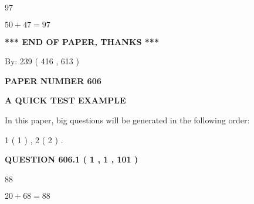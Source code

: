 \documentclass[12pt]{article}
\begin{document}
97
 
 
 
 
\noindent{}

$ %
50 +  %
47=   %
97$
 
 
   
   
 \vspace{0.2in}
 
   
   
   
   
\vspace{1.0in} 
{\textbf{\large{ *** END OF PAPER, THANKS *** }}} 
   
   
\hspace{1.0in} By: 
 239 ( 416 ,  613 )
   
   
   
   
\newpage 
\setcounter{page}{ 
   606001 } 
   
   
   
   
 {\textbf{ \Large{ PAPER NUMBER  606  }}}
   
   
\vspace{0.2in}
   
   
   
   
   
   
 \vspace{0.2in}
{\LARGE {\textbf{ A QUICK TEST EXAMPLE}}}
   
   
   
\vspace{0.2in}
   
In this paper, big questions will be generated in the following order: 
   
   
   1 ( 1 )
 ,
   2 ( 2 )
 .
  
\vspace{0.2in}
  
{\textbf{\Large{QUESTION
606.1 
 ( 1 , 1 , 101 )
}}}
  
  
 
 
\noindent{}

88
 
 
 
 
\noindent{}

$ %
20 +  %
68=   %
88$
 
\end{document}
